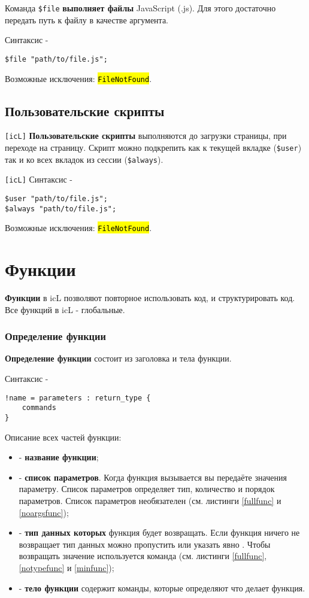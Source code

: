\documentclass[a4paper, 14pt]{extarticle}
\newcommand{\ferror}[1]{{\fontsize{11pt}{12pt}\tt{\sethlcolor{yellow}\hl{#1}}}}
\newenvironment{icItems}
	{ \begin{itemize} [noitemsep,nolistsep] }
	{ \end{itemize} }
\begin{document}
Команда \lstinline|$file| {\bf выполняет файлы} JavaScript (.js). Для этого достаточно передать путь к файлу в качестве аргумента.

Синтаксис -
\begin{lstlisting}[numbers=none]
$file "path/to/file.js";
\end{lstlisting}

Возможные исключения: \ferror{FileNotFound}.

\subsection{Пользовательские скрипты}

\lstinline|[icL]| {\bf Пользовательские скрипты} выполняются до загрузки страницы, при переходе на страницу. Скрипт можно подкрепить как к текущей вкладке (\lstinline|$user|) так и ко всех вкладок из сессии (\lstinline|$always|).

\lstinline|[icL]| Синтаксис -
\begin{lstlisting}[numbers=none]
$user "path/to/file.js";
$always "path/to/file.js";
\end{lstlisting}

Возможные исключения: \ferror{FileNotFound}.

\newpage
\section{Функции}

{\bf Функции} в icL позволяют повторное использовать код, и структурировать код. Все функций в icL - глобальные.

\subsubsection{Определение функции}

{\bf Определение функции} состоит из заголовка и тела функции.

\noindent Синтаксис -
\begin{lstlisting}[numbers=none]
!name = parameters : return_type {
	commands
}
\end{lstlisting}

Описание всех частей функции:
\begin{icItems}
\item
	 - {\bf название функции};
\item
	 - {\bf список параметров}. Когда функция вызывается вы передаёте значения параметру. Список параметров определяет тип, количество и порядок параметров. Список параметров необязателен (см. листинги \ref{fullfunc} и \ref{noargsfunc});
\item
	 - {\bf тип данных которых} функция будет возвращать. Если функция ничего не возвращает тип данных можно пропустить или указать явно \void{}. Чтобы возвращать значение используется команда  (см. листинги \ref{fullfunc}, \ref{notypefunc} и \ref{minfunc});
\item
	 - {\bf тело функции} содержит команды, которые определяют что делает функция.
\end{icItems}
\end{document}
